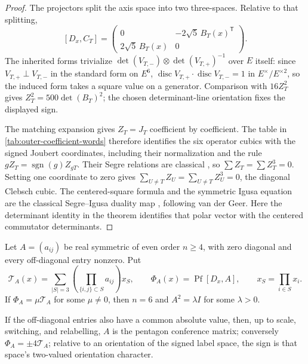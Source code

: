 \begin{proof}
The projectors split the axis space into two three-spaces.  Relative to that
splitting,
\[
 [D_x,C_T]=
 \begin{pmatrix}
 0&-2\sqrt5\,B_T(x)^{\mathsf T}\\
 2\sqrt5\,B_T(x)&0
 \end{pmatrix}.
\]
The inherited forms trivialize
\(\det(V_{T,-})\otimes\det(V_{T,+})^{-1}\) over \(E\) itself: since
\(V_{T,+}\perp V_{T,-}\) in the standard form on \(E^6\),
\(\operatorname{disc}V_{T,+}\cdot\operatorname{disc}V_{T,-}=1\) in
\(E^\times/E^{\times2}\), so the induced form takes a square value on a
generator.  Comparison with \(16Z_T^2\) gives
\(Z_T^2=500\det(B_T)^2\); the chosen determinant-line orientation fixes the
displayed sign.

The matching expansion gives \(Z_T=J_T\) coefficient by coefficient.
The table in \eqref{tab:outer-coefficient-words} therefore identifies the six operator cubics with the signed
Joubert coordinates, including their normalization and the rule
\(gZ_T=\operatorname{sgn}(g)Z_{gT}\).  Their Segre relations are classical
\cite[Sections~2.1--2.2]{HMSVOuter}, so
\(\sum Z_T=\sum Z_T^3=0\).  Setting one coordinate to zero gives
\(\sum_{U\ne T}Z_U=\sum_{U\ne T}Z_U^3=0\), the diagonal Clebsch cubic.
The centered-square formula and the symmetric Igusa equation are the
classical Segre--Igusa duality map \cite[Section~2.2]{HMSVOuter}, following
van der Geer.  Here the determinant identity in the theorem identifies that
polar vector with the centered commutator determinants.
\end{proof}

\begin{theorem}
\label{thm:triangle-pfaffian-recognition}
Let \(A=(a_{ij})\) be real symmetric of even order \(n\geq4\), with zero
diagonal and every off-diagonal entry nonzero.  Put
\[
 \mathcal T_A(x)=\sum_{|S|=3}
 \left(\prod_{\{i,j\}\subset S}a_{ij}\right)x_S,
 \qquad
 \Phi_A(x)=\operatorname{Pf}[D_x,A],
 \qquad x_S=\prod_{i\in S}x_i.
\]
If \(\Phi_A=\mu\mathcal T_A\) for some \(\mu\ne0\), then \(n=6\) and
\(A^2=\lambda I\) for some \(\lambda>0\).

If the off-diagonal entries also have a common absolute value, then, up to scale, switching,
and relabelling, \(A\) is the pentagon conference matrix; conversely
\(\Phi_A=\pm4\mathcal T_A\); relative to an orientation of the signed label space,
the sign is that space's two-valued orientation character.
\end{theorem}

